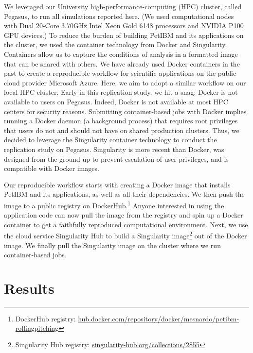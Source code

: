 We leveraged our University high-performance-computing (HPC) cluster, called Pegasus, to run all simulations reported here.
(We used computational nodes with Dual 20-Core 3.70GHz Intel Xeon Gold 6148 processors and NVIDIA P100 GPU devices.)
To reduce the burden of building PetIBM and its applications on the cluster, we used the container technology from Docker\supercite{merkel_2014} and Singularity.\supercite{kurtzer_et_al_2017}
Containers allow us to capture the conditions of analysis in a formatted image that can be shared with others.
We have already used Docker containers in the past to create a reproducible workflow for scientific applications on the public cloud provider Microsoft Azure.\supercite{mesnard_barba_2020}
Here, we aim to adopt a similar workflow on our local HPC cluster.
Early in this replication study, we hit a snag: Docker is not available to users on Pegasus.
Indeed, Docker is not available at most HPC centers for security reasons.
Submitting container-based jobs with Docker implies running a Docker daemon (a background process) that requires root privileges that users do not and should not have on shared production clusters.
Thus, we decided to leverage the Singularity container technology to conduct the replication study on Pegasus.
Singularity is more recent than Docker, was designed from the ground up to prevent escalation of user privileges, and is compatible with Docker images.

Our reproducible workflow starts with creating a Docker image that installs PetIBM and its applications, as well as all their dependencies.
We then push the image to a public registry on DockerHub.\footnote{DockerHub registry: \url{hub.docker.com/repository/docker/mesnardo/petibm-rollingpitching}}
Anyone interested in using the application code can now pull the image from the registry and spin up a Docker container to get a faithfully reproduced computational environment.
Next, we use the cloud service Singularity Hub to build a Singularity image\footnote{Singularity Hub registry: \url{singularity-hub.org/collections/2855}} out of the Docker image.
We finally pull the Singularity image on the cluster where we run container-based jobs.

\section{Results}

